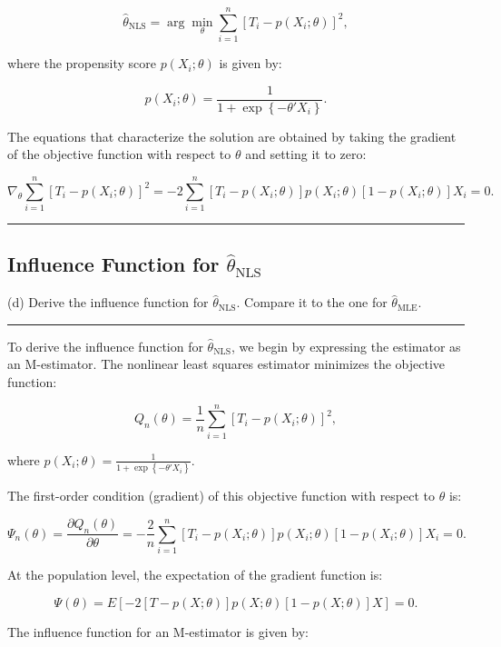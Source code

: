 \documentclass{article}
\newenvironment{colorparagraph}[1]{\par\color{#1}}{\par}
\begin{document}
\[
\hat{\theta}_{\text{NLS}} = \arg\min_{\theta} \sum_{i=1}^n \left[ T_i - p(X_i; \theta) \right]^2,
\]

where the propensity score \( p(X_i; \theta) \) is given by:

\[
p(X_i; \theta) = \frac{1}{1 + \exp\left\{ - \theta' X_i \right\}}.
\]

The equations that characterize the solution are obtained by taking the gradient of the objective function with respect to \( \theta \) and setting it to zero:

\[
\nabla_{\theta} \sum_{i=1}^n \left[ T_i - p(X_i; \theta) \right]^2 = -2 \sum_{i=1}^n \left[ T_i - p(X_i; \theta) \right] p(X_i; \theta) [1 - p(X_i; \theta)] X_i = 0.
\]

\begin{colorparagraph}{questioncolor}
\label{q1d}
\rule{\textwidth}{0.5pt}
\subsection{Influence Function for \( \hat{\theta}_{\text{NLS}} \)}
(d) Derive the influence function for \( \hat{\theta}_{\text{NLS}} \).
Compare it to the one for \( \hat{\theta}_{\text{MLE}} \).

\rule{\textwidth}{0.5pt}
\end{colorparagraph}

To derive the influence function for \( \hat{\theta}_{\text{NLS}} \), we begin by expressing the estimator as an M-estimator. The nonlinear least squares estimator minimizes the objective function:

\[
Q_n(\theta) = \frac{1}{n} \sum_{i=1}^n \left[ T_i - p(X_i; \theta) \right]^2,
\]

where \( p(X_i; \theta) = \frac{1}{1 + \exp\left\{ - \theta' X_i \right\}} \).

The first-order condition (gradient) of this objective function with respect to \( \theta \) is:

\[
\Psi_n(\theta) = \frac{\partial Q_n(\theta)}{\partial \theta} = -\frac{2}{n} \sum_{i=1}^n \left[ T_i - p(X_i; \theta) \right] p(X_i; \theta) [1 - p(X_i; \theta)] X_i = 0.
\]

At the population level, the expectation of the gradient function is:

\[
\Psi(\theta) = E \left[ -2 \left[ T - p(X; \theta) \right] p(X; \theta) [1 - p(X; \theta)] X \right] = 0.
\]

The influence function for an M-estimator is given by:
\end{document}
